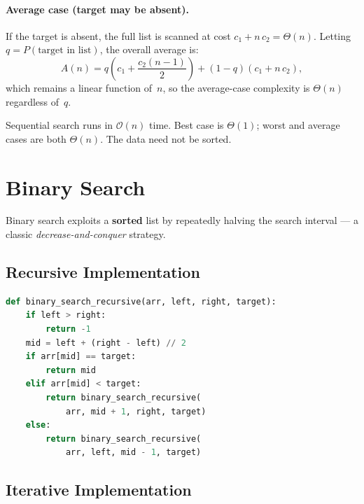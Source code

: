 \documentclass[11pt, a4paper, notitlepage]{report}
\theoremstyle{definition}
\theoremstyle{remark}
\theoremstyle{definition}
\begin{document}
\paragraph{Average case (target may be absent).}
If the target is absent, the full list is scanned at cost $c_1 + n\,c_2 = \Theta(n)$.
Letting $q = P(\text{target in list})$, the overall average is:
\[
  A(n) = q\left(c_1 + \frac{c_2(n-1)}{2}\right) + (1-q)(c_1 + n\,c_2),
\]
which remains a linear function of~$n$, so the average-case complexity is
$\Theta(n)$ regardless of~$q$.

\begin{keyresult}[title={Sequential Search Complexity}]
Sequential search runs in $\mathcal{O}(n)$ time.  Best case is $\Theta(1)$;
worst and average cases are both $\Theta(n)$.  The data need not be sorted.
\end{keyresult}

\section{Binary Search}
\label{sec:binary-search}

Binary search exploits a \textbf{sorted} list by repeatedly halving the search
interval --- a classic \emph{decrease-and-conquer} strategy.

\subsection{Recursive Implementation}
\label{subsec:binsearch-recursive}

\begin{lstlisting}[language=Python]
def binary_search_recursive(arr, left, right, target):
    if left > right:
        return -1
    mid = left + (right - left) // 2
    if arr[mid] == target:
        return mid
    elif arr[mid] < target:
        return binary_search_recursive(
            arr, mid + 1, right, target)
    else:
        return binary_search_recursive(
            arr, left, mid - 1, target)
\end{lstlisting}

\subsection{Iterative Implementation}
\label{subsec:binsearch-iterative}
\end{document}
